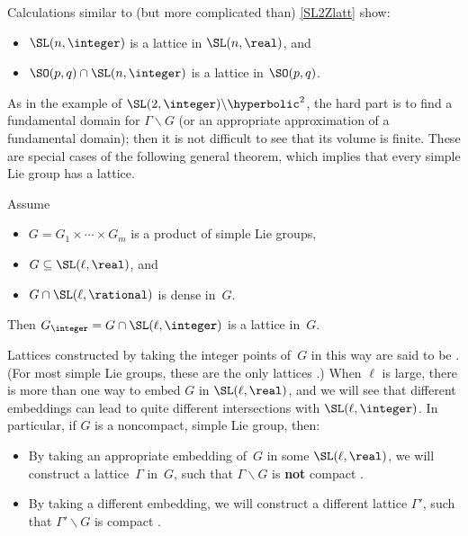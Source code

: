 Calculations similar to (but more complicated than)
\cref{SL2Zlatt} show:
 \begin{itemize}
 \item $\SL(n,\integer)$ is a lattice in $\SL(n,\real)$, and
 \item $\SO(p,q) \cap \SL(n,\integer)$ is a lattice in $\SO(p,q)$.
 \end{itemize}
 As in the example of $\SL(2,\integer) \backslash \hyperbolic^2$, the
hard part is to find a fundamental domain for $\Gamma \backslash G$
(or an appropriate approximation of a fundamental domain); then it is
not difficult to see that its volume is finite.
 These are special cases of the following general theorem, which
implies that every simple Lie group has a lattice.

\begin{thm}
\label{Arith->Latt}
 Assume 
 \begin{itemize}
 \item $G = G_1 \times \cdots \times G_m$ is a product of simple Lie
groups,
 \item $G \subseteq \SL(\ell,\real)$, and 
 \item $G \cap \SL(\ell,\rational)$ is dense in~$G$.
 \end{itemize} Then $G_{\integer} = G \cap \SL(\ell,\integer)$ is a
lattice in~$G$.
 \end{thm}

Lattices constructed by taking the integer points of~$G$ in this way
are said to be  . (For most
simple Lie groups, these are the only lattices .)
When $\ell$ is large, there is more than one way to embed $G$ in
$\SL(\ell,\real)$, and we will see that different embeddings can lead
to quite different intersections with $\SL(\ell,\integer)$. In particular, if $G$ is a noncompact, simple Lie group, then:
	\begin{itemize}
	\item By taking
an appropriate embedding of~$G$ in some $\SL(\ell,\real)$, we will
construct a lattice~$\Gamma$ in~$G$, such that $\Gamma \backslash G$ is \textbf{not} compact .
	\item By taking a different
embedding, we will construct a different lattice $\Gamma'$, such that
$\Gamma' \backslash G$ is compact .
	\end{itemize}

